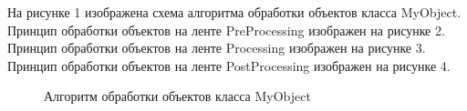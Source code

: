 \documentclass[a4paper,14pt]{report}
\begin{document}
На рисунке 1 изображена схема алгоритма обработки объектов класса MyObject.
Принцип обработки объектов на ленте PreProcessing изображен на рисунке 2.
Принцип обработки объектов на ленте Processing изображен на рисунке 3.
Принцип обработки объектов на ленте PostProcessing изображен на рисунке 4.


\begin{figure}
\caption{Алгоритм обработки объектов класса MyObject}
\label{fig:image}
\end{figure}
\end{document}
